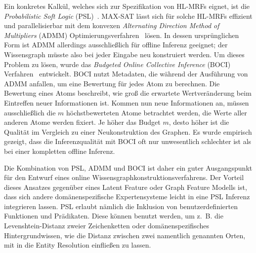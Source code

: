 Ein konkretes Kalkül, welches sich zur Spezifikation von HL-MRFs eignet, ist die \textit{Probabilistic Soft Logic} (PSL)~\cite{Broecheler2010}\cite{Bach2015}.
MAX-SAT lässt sich für solche HL-MRFs effizient und parallelisierbar mit dem konvexen \textit{Alternating Direction Method of Multipliers} (ADMM) Optimierungsverfahren~\cite{Boyd2011} lösen.
In dessen ursprünglichen Form ist ADMM allerdings ausschließlich für offline Inferenz geeignet;
der Wissensgraph müsste also bei jeder Eingabe neu konstruiert werden.
Um dieses Problem zu lösen, wurde das \textit{Budgeted Online Collective Inference} (BOCI) Verfahren~\cite{Pujara2015} entwickelt.
BOCI nutzt Metadaten, die während der Ausführung von ADMM anfallen, um eine Bewertung für jedes Atom zu berechnen.
Die Bewertung eines Atoms beschreibt, wie groß die erwartete Wertveränderung beim Eintreffen neuer Informationen ist.
Kommen nun neue Informationen an, müssen ausschließlich die $m$ höchstbewerteten Atome betrachtet werden, die Werte aller anderen Atome werden fixiert.
Je höher das Budget $m$, desto höher ist die Qualität im Vergleich zu einer Neukonstruktion des Graphen.
Es wurde empirisch gezeigt, dass die Inferenzqualität mit BOCI oft nur unwesentlich schlechter ist als bei einer kompletten offline Inferenz.

Die Kombination von PSL, ADMM und BOCI ist daher ein guter Ausgangspunkt für den Entwurf eines online Wissensgraphkonstruktionsverfahrens.
Der Vorteil dieses Ansatzes gegenüber eines Latent Feature oder Graph Feature Modells ist, dass sich andere domänenspezifische Expertensysteme leicht in eine PSL Inferenz integrieren lassen.
PSL erlaubt nämlich die Inklusion von benutzerdefinierten Funktionen und Prädikaten.
Diese können benutzt werden, um z.~B. die Levenshtein-Distanz zweier Zeichenketten oder domänenspezifisches Hintergrundwissen, wie die Distanz zwischen zwei namentlich genannten Orten, mit in die Entity Resolution einfließen zu lassen.
